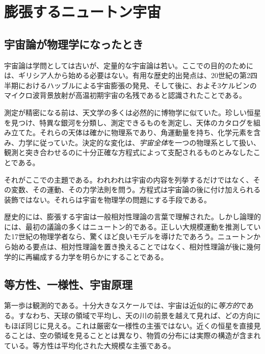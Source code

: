 \chapter{膨張するニュートン宇宙}


\section{宇宙論が物理学になったとき}

宇宙論は学問としては古いが、定量的な宇宙論は若い。ここでの目的のためには、ギリシア人から始める必要はない。有用な歴史的出発点は、20世紀の第2四半期におけるハッブルによる宇宙膨張の発見、そして後に、およそ3ケルビンのマイクロ波背景放射が高温初期宇宙の名残であると認識されたことである。

測定が精密になる前は、天文学の多くは必然的に博物学に似ていた。珍しい恒星を見つけ、特異な銀河を分類し、測定できるものを測定し、天体のカタログを組み立てた。それらの天体は確かに物理系であり、角運動量を持ち、化学元素を含み、力学に従っていた。決定的な変化は、\emph{宇宙全体}を一つの物理系として扱い、観測と突き合わせるのに十分正確な方程式によって支配されるものとみなしたことである。

それがここでの主題である。われわれは宇宙の内容を列挙するだけではなく、その変数、その運動、その力学法則を問う。方程式は宇宙論の後に付け加えられる装飾ではない。それらは宇宙を物理学の問題にする手段である。

歴史的には、膨張する宇宙は一般相対性理論の言葉で理解された。しかし論理的には、最初の議論の多くはニュートン的である。正しい大規模運動を推測していた17世紀の物理学者なら、驚くほど良いモデルを導けたであろう。ニュートンから始める要点は、相対性理論を置き換えることではなく、相対性理論が後に幾何学的に再編成する力学を明らかにすることである。

\section{等方性、一様性、宇宙原理}

第一歩は観測的である。十分大きなスケールでは、宇宙は近似的に\emph{等方的}である。すなわち、天球の領域で平均し、天の川の前景を越えて見れば、どの方向にもほぼ同じに見える。これは厳密な一様性の主張ではない。近くの恒星を直接見ることは、空の領域を見ることとは異なり、物質の分布には実際の構造が含まれている。等方性は平均化された大規模な主張である。

